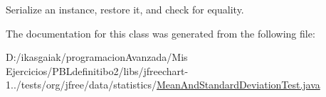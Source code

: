 Serialize an instance, restore it, and check for equality. 

The documentation for this class was generated from the following file\+:\begin{DoxyCompactItemize}
\item 
D\+:/ikasgaiak/programacion\+Avanzada/\+Mis Ejercicios/\+P\+B\+Ldefinitibo2/libs/jfreechart-\/1../tests/org/jfree/data/statistics/\mbox{\hyperlink{_mean_and_standard_deviation_test_8java}{Mean\+And\+Standard\+Deviation\+Test.\+java}}\end{DoxyCompactItemize}
